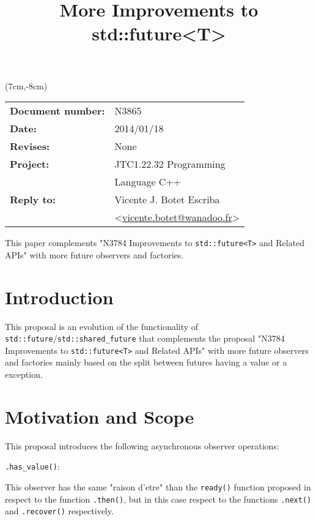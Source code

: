 \documentclass[a4paper,10pt]{article}
\title{More Improvements to std::future<T>}
\author{}
\date{}
\newcommand{\cpp}[1]{\lstinline{#1}}
\begin{document}
\maketitle
\begin{textblock*}{9cm}(7cm,-8cm)
\begin{tabular}{l l}
\textbf{Document number:} & N3865 \\
\textbf{Date:}  & 2014/01/18 \\
\textbf{Revises:} & None \\
\textbf{Project:} & JTC1.22.32 Programming \\
 & Language C++ \\
\textbf{Reply to:} & Vicente J. Botet Escriba \\
 & <\href{mailto:vicente.botet@wanadoo.fr}{vicente.botet@wanadoo.fr}> 
  
\end{tabular}
\end{textblock*}

\vspace{-6em}
\setcounter{tocdepth}{1}

This paper complements "N3784 Improvements to \cpp{std::future<T>} and Related APIs" \cite{N3784} with more future observers and factories.

\tableofcontents


\section{Introduction}

This proposal is an evolution of the functionality of \cpp{std::future}/\cpp{std::shared_future} that complements the proposal "N3784 Improvements to \cpp{std::future<T>} and Related APIs"  \cite{N3784} with more future observers and factories mainly based on the split between futures having a value or a exception.

\section{Motivation and Scope}

This proposal introduces the following asynchronous observer operations:

\cpp{.has_value()}:

This observer has the same "raison d'etre" than the \cpp{ready()} function proposed in  \cite{N3784} respect to the function \cpp{.then()}, but in this case respect to the functions \cpp{.next()} and \cpp{.recover()} respectively.
\end{document}
